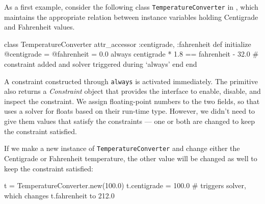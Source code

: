 \DIFaddbegin 

\DIFaddend As a first example, consider the following class
\lstinline{TemperatureConverter} in \DIFaddbegin \linebreak \DIFaddend \toolname, which maintains the
appropriate relation between instance variables holding Centigrade and
Fahrenheit values.

\begin{code}
class TemperatureConverter
  attr_accessor :centigrade, :fahrenheit
  def initialize
    @centigrade = @fahrenheit = 0.0
    always { centigrade * 1.8 == fahrenheit - 32.0 }
    # constraint added and solver triggered during `always'
  end
end
\end{code}

A constraint constructed through \lstinline{always} is activated
immediately. The primitive also returns a \emph{Constraint} object
that provides the interface to enable, disable, and inspect the
constraint. We assign floating-point numbers to the two fields, so
that \toolname uses a solver for floats based on their run-time
type. However, we didn't need to give them values that satisfy the
constraints --- one or both are changed to keep the constraint
satisfied.

If we make a new instance of \lstinline{TemperatureConverter} and
change either the Centigrade or Fahrenheit temperature, the other
value will be changed as well to keep the constraint satisfied:

\begin{code}
t = TemperatureConverter.new(100.0)
t.centigrade = 100.0 # triggers solver, which changes t.fahrenheit to 212.0
\end{code}




